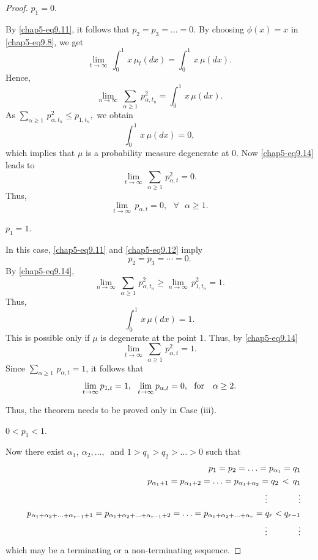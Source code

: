\begin{proof}
 $p_1=0$. 

By \eqref{chap5-eq9.11}, it follows that  $p_2=p_3=\ldots =0$. By choosing $\phi(x)=x$ in \eqref{chap5-eq9.8}, we get  
\begin{equation}
	\underset{t\rightarrow\infty}{\lim}\, \int_0^1\, x\, \mu_t(dx) =\int_0^1\, x\, \mu(dx). \label{chap5-eq9.13}
\end{equation}
Hence, 
\begin{equation}
	\underset{n\rightarrow\infty}{\lim}\, \sum_{\alpha\geq 1}\, p^2_{\alpha,t_n}=\int_0^1\, x\, \mu(dx).\label{chap5-eq9.14}
\end{equation}
As $\sum_{\alpha\geq 1}\, p^2_{\alpha,t_n}\leq p_{1, t_n},$
we obtain 
$$
\int_0^1\, x\, \mu(dx)=0,
$$
which implies that $\mu$ is a probability measure degenerate at 0. 
Now \eqref{chap5-eq9.14} leads to   
$$
\underset{t\rightarrow\infty}{\lim}\, \sum_{\alpha\geq 1}\,  p^2_{\alpha,t}=0.
$$ 
Thus, 
$$
\underset{t\rightarrow\infty}{\lim}\,  p_{\alpha,t}=0, \ \ \ \forall \ \ \ \alpha\geq 1.
$$

 $p_1=1$. 

In this case, \eqref{chap5-eq9.11} and \eqref{chap5-eq9.12} imply
$$
p_2=p_3=\cdots =0.
$$
By \eqref{chap5-eq9.14}, 
$$
\underset{n\rightarrow\infty}{\lim}\, \sum_{\alpha\geq 1}\, p^2_{\alpha,t_n}\geq \underset{n\rightarrow\infty}{\lim}\, p^2_{1, t_n}=1.
$$  
Thus, 
$$ \int_0^1\, x\, \mu(dx)=1.$$
This is possible only if $\mu$ is degenerate at the point 1. Thus,  by \eqref{chap5-eq9.14} 
$$
\underset{t\rightarrow\infty}{\lim}\, \sum_{\alpha\geq 1}\, p^2_{\alpha,t}=1.
$$ 
Since  $\displaystyle\sum_{\alpha\geq 1}\, p_{\alpha,t}=1$,  it follows that 
$$
\underset{t\rightarrow\infty}{\lim}\, p_{1,t}=1,\ \ \underset{t\rightarrow\infty}{\lim}\, p_{\alpha,t}=0, \ \ {\rm for} \ \ \ \alpha\geq 2.
$$ 

Thus, the theorem needs to be proved only in Case (iii). 

 $0< p_1< 1.$ 

Now there exist $\alpha_1,\ \alpha_2,\ldots,\ $ and $1> q_1>q_2>\ldots >0$ such that   
\begin{eqnarray*}
	&& p_1=p_2=\ldots =p_{\alpha_1}=q_1 \\ 
	&& p_{\alpha_1+1}=p_{\alpha_1+2}=\ldots =p_{\alpha_1+\alpha_2}= q_2\, <\, q_1 \\ 
	&& \hskip 1in  \vdots  \hskip 0.5in \vdots   \\  
	&& p_{\alpha_1+\alpha_2+\ldots +\alpha_{r-1}+1}=p_{\alpha_1+\alpha_2+\ldots +\alpha_{r-1}+2}=\ldots = p_{\alpha_1+\alpha_2+\ldots +\alpha_{r}}= q_r < q_{r-1} \\ 
	&& \hskip 1in  \vdots  \hskip 0.5in \vdots  
\end{eqnarray*}
which may be a terminating or a non-terminating sequence.  


\end{proof}
